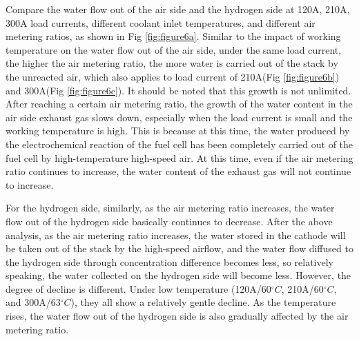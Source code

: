 Compare the water flow out of the air side and the hydrogen side at 120A, 210A, 300A load currents, different coolant inlet temperatures, and different air metering ratios, as shown in Fig \ref{fig:figure6a}. Similar to the impact of working temperature on the water flow out of the air side, under the same load current, the higher the air metering ratio, the more water is carried out of the stack by the unreacted air, which also applies to load current of 210A(Fig \ref{fig:figure6b}) and 300A(Fig \ref{fig:figure6c}). It should be noted that this growth is not unlimited. After reaching a certain air metering ratio, the growth of the water content in the air side exhaust gas slows down, especially when the load current is small and the working temperature is high. This is because at this time, the water produced by the electrochemical reaction of the fuel cell has been completely carried out of the fuel cell by high-temperature high-speed air. At this time, even if the air metering ratio continues to increase, the water content of the exhaust gas will not continue to increase.

\par
For the hydrogen side, similarly, as the air metering ratio increases, the water flow out of the hydrogen side basically continues to decrease. After the above analysis, as the air metering ratio increases, the water stored in the cathode will be taken out of the stack by the high-speed airflow, and the water flow diffused to the hydrogen side through concentration difference becomes less, so relatively speaking, the water collected on the hydrogen side will become less. However, the degree of decline is different. Under low temperature (120A/60$^{\circ}C$, 210A/60$^{\circ}C$, and 300A/63$^{\circ}C$), they all show a relatively gentle decline. As the temperature rises, the water flow out of the hydrogen side is also gradually affected by the air metering ratio.

